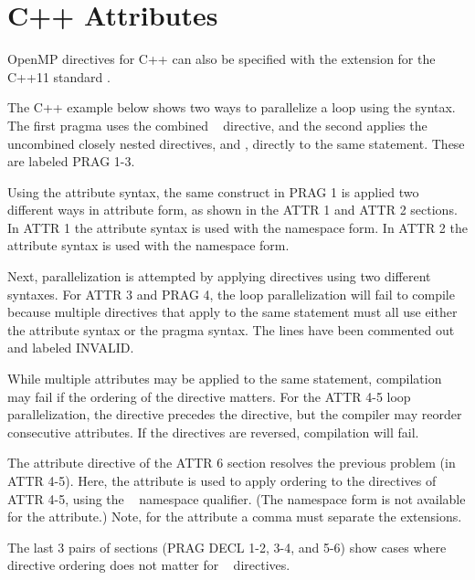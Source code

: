 \section{C++ Attributes}
\label{sec:attributes}

OpenMP directives for C++ can also be specified with 
the  extension for the C++11 standard .

The C++ example below shows two ways to parallelize a  loop using the  syntax.
The first pragma uses the combined ~ directive, and the second
applies the uncombined closely nested directives,  and , directly to the same statement. 
These are labeled PRAG 1-3.

Using the attribute syntax, the same construct in PRAG 1
is applied two different ways in attribute form, as shown in the ATTR 1 and ATTR 2 sections.
In ATTR 1 the attribute syntax is used with the  namespace form.
In ATTR 2 the attribute syntax is used with the  namespace form.

Next, parallelization is attempted by applying directives using two different syntaxes.
For ATTR 3 and PRAG 4, the loop parallelization will fail to compile because multiple directives that
apply to the same statement must all use either the attribute syntax or the pragma syntax.
The lines have been commented out and labeled INVALID.

While multiple attributes may be applied to the same statement,
compilation may fail if the ordering of the directive matters.
For the ATTR 4-5 loop parallelization, the  directive precedes 
the  directive, but the compiler may reorder consecutive attributes.
If the directives are reversed, compilation will fail.

The attribute directive of the ATTR 6 section resolves the previous problem (in ATTR 4-5).
Here, the  attribute is used to apply ordering to the
directives of ATTR 4-5, using the ~\code{::} namespace qualifier. (The
 namespace form is not available for the  attribute.) 
Note, for the  attribute a comma must separate the  extensions.


The last 3 pairs of sections (PRAG DECL 1-2, 3-4, and 5-6) show cases where 
directive ordering does not matter for ~ directives. 

